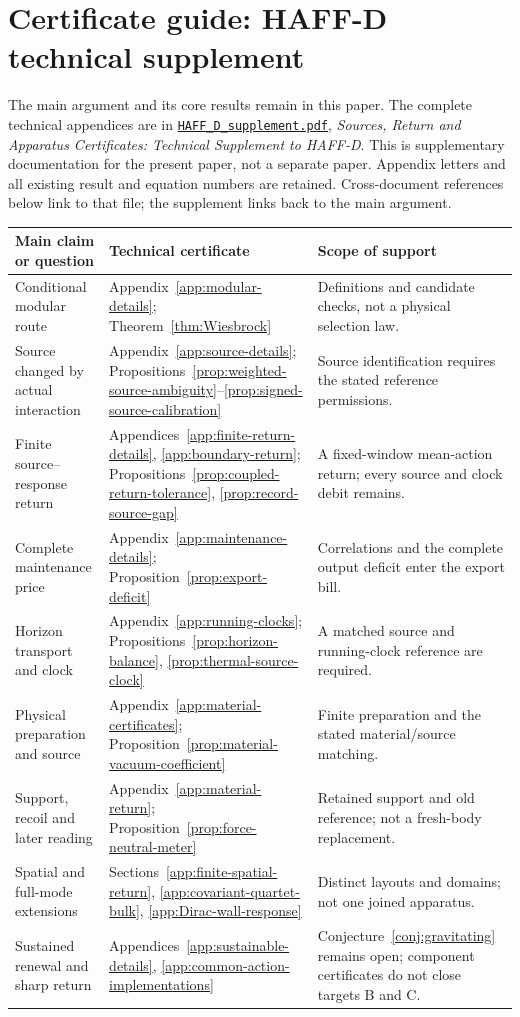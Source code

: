 \clearpage
\section*{Certificate guide: HAFF-D technical supplement}
\noindent The main argument and its core results remain in this paper.
The complete technical appendices are in
\href{HAFF_D_supplement.pdf}{\texttt{HAFF\_D\_supplement.pdf}},
\emph{Sources, Return and Apparatus Certificates: Technical Supplement
to HAFF-D}. This is supplementary documentation for the present paper,
not a separate paper. Appendix letters and all existing result and
equation numbers are retained. Cross-document references below link
to that file; the supplement links back to the main argument.

\medskip
{\small
\noindent\begin{tabular}{@{}P{.24\linewidth}P{.32\linewidth}P{.36\linewidth}@{}}
\toprule
Main claim or question & Technical certificate & Scope of support\\
\midrule
Conditional modular route &
Appendix~\ref{app:modular-details};
Theorem~\ref{thm:Wiesbrock} &
Definitions and candidate checks, not a physical selection law.\\[3pt]
Source changed by actual interaction &
Appendix~\ref{app:source-details};
Propositions~\ref{prop:weighted-source-ambiguity}--\ref{prop:signed-source-calibration} &
Source identification requires the stated reference permissions.\\[3pt]
Finite source--response return &
Appendices~\ref{app:finite-return-details}, \ref{app:boundary-return};
Propositions~\ref{prop:coupled-return-tolerance}, \ref{prop:record-source-gap} &
A fixed-window mean-action return; every source and clock debit remains.\\[3pt]
Complete maintenance price &
Appendix~\ref{app:maintenance-details};
Proposition~\ref{prop:export-deficit} &
Correlations and the complete output deficit enter the export bill.\\[3pt]
Horizon transport and clock &
Appendix~\ref{app:running-clocks};
Propositions~\ref{prop:horizon-balance}, \ref{prop:thermal-source-clock} &
A matched source and running-clock reference are required.\\[3pt]
Physical preparation and source &
Appendix~\ref{app:material-certificates};
Proposition~\ref{prop:material-vacuum-coefficient} &
Finite preparation and the stated material/source matching.\\[3pt]
Support, recoil and later reading &
Appendix~\ref{app:material-return};
Proposition~\ref{prop:force-neutral-meter} &
Retained support and old reference; not a fresh-body replacement.\\[3pt]
Spatial and full-mode extensions &
Sections~\ref{app:finite-spatial-return}, \ref{app:covariant-quartet-bulk},
\ref{app:Dirac-wall-response} &
Distinct layouts and domains; not one joined apparatus.\\[3pt]
Sustained renewal and sharp return &
Appendices~\ref{app:sustainable-details},
\ref{app:common-action-implementations} &
Conjecture~\ref{conj:gravitating} remains open; component certificates
do not close targets B and C.\\
\bottomrule
\end{tabular}
}
\clearpage
